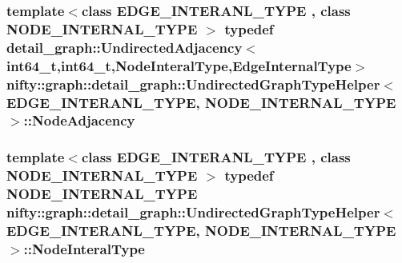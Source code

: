 \subsubsection[{Node\+Adjacency}]{\setlength{\rightskip}{0pt plus 5cm}template$<$class E\+D\+G\+E\+\_\+\+I\+N\+T\+E\+R\+A\+N\+L\+\_\+\+T\+Y\+P\+E , class N\+O\+D\+E\+\_\+\+I\+N\+T\+E\+R\+N\+A\+L\+\_\+\+T\+Y\+P\+E $>$ typedef detail\+\_\+graph\+::\+Undirected\+Adjacency$<$int64\+\_\+t,int64\+\_\+t,{\bf Node\+Interal\+Type},{\bf Edge\+Internal\+Type}$>$ {\bf nifty\+::graph\+::detail\+\_\+graph\+::\+Undirected\+Graph\+Type\+Helper}$<$ E\+D\+G\+E\+\_\+\+I\+N\+T\+E\+R\+A\+N\+L\+\_\+\+T\+Y\+P\+E, N\+O\+D\+E\+\_\+\+I\+N\+T\+E\+R\+N\+A\+L\+\_\+\+T\+Y\+P\+E $>$\+::{\bf Node\+Adjacency}}\label{structnifty_1_1graph_1_1detail__graph_1_1UndirectedGraphTypeHelper_a626e3edd4cc8c7e33ec89e6a7454561a}
\hypertarget{structnifty_1_1graph_1_1detail__graph_1_1UndirectedGraphTypeHelper_a4c2041ab030e3eb561a2955a3bbfb5d7}{}
\subsubsection[{Node\+Interal\+Type}]{\setlength{\rightskip}{0pt plus 5cm}template$<$class E\+D\+G\+E\+\_\+\+I\+N\+T\+E\+R\+A\+N\+L\+\_\+\+T\+Y\+P\+E , class N\+O\+D\+E\+\_\+\+I\+N\+T\+E\+R\+N\+A\+L\+\_\+\+T\+Y\+P\+E $>$ typedef N\+O\+D\+E\+\_\+\+I\+N\+T\+E\+R\+N\+A\+L\+\_\+\+T\+Y\+P\+E {\bf nifty\+::graph\+::detail\+\_\+graph\+::\+Undirected\+Graph\+Type\+Helper}$<$ E\+D\+G\+E\+\_\+\+I\+N\+T\+E\+R\+A\+N\+L\+\_\+\+T\+Y\+P\+E, N\+O\+D\+E\+\_\+\+I\+N\+T\+E\+R\+N\+A\+L\+\_\+\+T\+Y\+P\+E $>$\+::{\bf Node\+Interal\+Type}}\label{structnifty_1_1graph_1_1detail__graph_1_1UndirectedGraphTypeHelper_a4c2041ab030e3eb561a2955a3bbfb5d7}
\hypertarget{structnifty_1_1graph_1_1detail__graph_1_1UndirectedGraphTypeHelper_a33768d5fbeda97627a0e4a67eb50776c}{}
